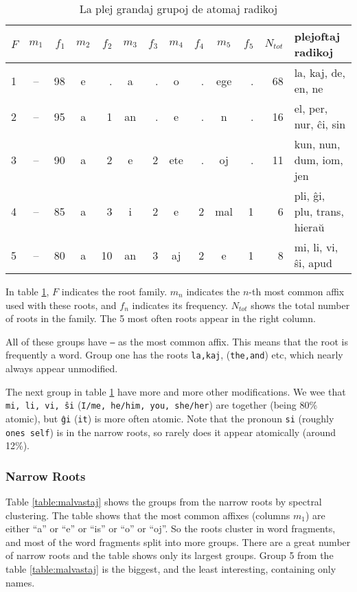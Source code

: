 \documentclass[12pt,twoside]{article}
\begin{document}
\vspace{.2 in}
\begin{table}[h!]
\begin{center}
\begin{tabular}{ |l||c|r||c|r||c|r||c|r||c|r||r|l| }
\hline
$F$& $m_1$ & $f_1$&$m_2$ & $f_2$&$m_3$ & $f_3$& $m_4$  & $f_4$& $m_5$ & $f_5$& $N_{tot}$ &   plejoftaj radikoj     \\
\hline
1   &--  &98   &e    &.   &a    &.    &o    &.  &ege    &.  &68          &la, kaj, de, en, ne \\
2   &--  &95   &a    &1  &an    &.    &e    &.    &n    &.  &16        &el, per, nur, ĉi, sin \\
3   &--  &90   &a    &2   &e    &2  &ete    &.   &oj    &.  &11      &kun, nun, dum, iom, jen \\
4   &--  &85   &a    &3   &i    &2    &e    &2  &mal    &1   &6  &pli, ĝi, plu, trans, hieraŭ \\
5   &--  &80   &a   &10  &an    &3   &aj    &2    &e    &1   &8         &mi, li, vi, ŝi, apud \\
\hline
\end{tabular}
\caption{La plej grandaj grupoj de atomaj radikoj}\label{table:atomoj}
\end{center}
\end{table}
\vspace{.2 in}

In table \ref{table:atomoj}, $F$ indicates the root family. $m_n$ indicates the $n$-th most common affix used with these roots,
and $f_n$ indicates its frequency. $N_{tot}$ shows the total number of roots in the family. The 5 most often roots appear in the right column.

All of these groups have \texttt{--} as the most common affix. This means that the root is frequently a word.
Group one has the roots \texttt{la,kaj}, (\texttt{the,and}) etc, which nearly always appear unmodified.

The next group in table \ref{table:atomoj} have more and more other modifications. We wee that \texttt{mi, li, vi, ŝi} (\texttt{I/me, he/him, you, she/her})
are together (being 80\% atomic), but \texttt{ĝi} (\texttt{it}) is more often atomic. Note that the pronoun \texttt{si} 
(roughly \texttt{ones self}) is in the narrow roots, so rarely does it appear atomically (around 12\%).

\subsubsection{Narrow Roots}
Table \ref{table:malvastaj} shows the groups from the narrow roots by spectral clustering.
The table shows that the most common affixes (columns $m_1$) are either ``a'' or ``e'' or ``is'' or ``o'' or ``oj''. 
So the roots cluster in word fragments, and most of the word fragments split into more groups.
There are a great number of narrow roots and the table shows only its largest groups. 
Group 5 from the table \ref{table:malvastaj} is the biggest, and the least interesting, containing only names.
\end{document}
